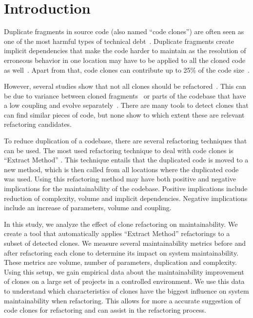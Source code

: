 \documentclass[sigconf,review,anonymous]{acmart}
\begin{document}

\maketitle

\section{Introduction}
Duplicate fragments in source code (also named ``code clones'') are often seen as one of the most harmful types of technical debt~\cite{fowler2018refactoring}. Duplicate fragments create implicit dependencies that make the code harder to maintain as the resolution of erroneous behavior in one location may have to be applied to all the cloned code as well~\cite{ostberg2014automatically, chatterji2013effects}. Apart from that, code clones can contribute up to 25\% of the code size~\cite{bruntink2005use}.

However, several studies show that not all clones should be refactored~\cite{jarzabek2010clones, kapser2008cloning}. This can be due to variance between cloned fragments~\cite{roy2007survey} or parts of the codebase that have a low coupling and evolve separately~\cite{jarzabek2010clones}. There are many tools to detect clones \cite{roy2007survey, sheneamer2016survey, svajlenko2014evaluating, gautam2016various} that can find similar pieces of code, but none show to which extent these are relevant refactoring candidates.

To reduce duplication of a codebase, there are several refactoring techniques that can be used. The most used refactoring technique to deal with code clones is ``Extract Method'' \cite{fowler2018refactoring}. This technique entails that the duplicated code is moved to a new method, which is then called from all locations where the duplicated code was used. Using this refactoring method may have both positive and negative implications for the maintainability of the codebase. Positive implications include reduction of complexity, volume and implicit dependencies. Negative implications include an increase of parameters, volume and coupling. 

In this study, we analyze the effect of clone refactoring on maintainability. We create a tool that automatically applies ``Extract Method'' refactorings to a subset of detected clones. We measure several maintainability metrics \cite{heitlager2007practical} before and after refactoring each clone to determine its impact on system maintainability. These metrics are volume, number of parameters, duplication and complexity. Using this setup, we gain empirical data about the maintainability improvement of clones on a large set of projects in a controlled environment. We use this data to understand which characteristics of clones have the biggest influence on system maintainability when refactoring. This allows for more a accurate suggestion of code clones for refactoring and can assist in the refactoring process.
\end{document}
